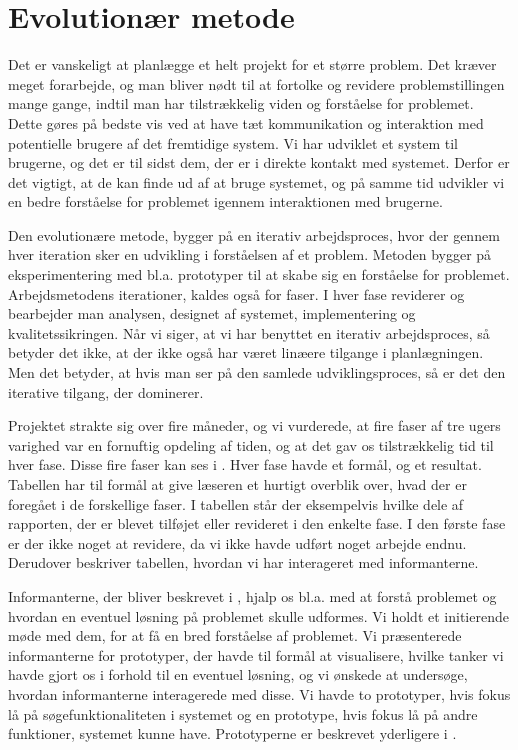 \section{Evolutionær metode}
\label{sec:evolution}

Det er vanskeligt at planlægge et helt projekt for et større problem. Det kræver meget forarbejde, og man bliver nødt til at fortolke og revidere problemstillingen mange gange, indtil man har tilstrækkelig viden og forståelse for problemet. Dette gøres på bedste vis ved at have tæt kommunikation og interaktion med potentielle brugere af det fremtidige system. Vi har udviklet et system til brugerne, og det er til sidst dem, der er i direkte kontakt med systemet. Derfor er det vigtigt, at de kan finde ud af at bruge systemet, og på samme tid udvikler vi en bedre forståelse for problemet igennem interaktionen med brugerne. 

Den evolutionære metode, bygger på en iterativ arbejdsproces, hvor der gennem hver iteration sker en udvikling i forståelsen af et problem. Metoden bygger på eksperimentering med bl.a. prototyper til at skabe sig en forståelse for problemet. Arbejdsmetodens iterationer, kaldes også for faser. I hver fase reviderer og bearbejder man analysen, designet af systemet, implementering og kvalitetssikringen. \cite{cic} Når vi siger, at vi har benyttet en iterativ arbejdsproces, så betyder det ikke, at der ikke også har været linæere tilgange i planlægningen. Men det betyder, at hvis man ser på den samlede udviklingsproces, så er det den iterative tilgang, der dominerer.

Projektet strakte sig over fire måneder, og vi vurderede, at fire faser af tre ugers varighed var en fornuftig opdeling af tiden, og at det gav os tilstrækkelig tid til hver fase. Disse fire faser kan ses i . Hver fase havde et formål, og et resultat. Tabellen har til formål at give læseren et hurtigt overblik over, hvad der er foregået i de forskellige faser. I tabellen står der eksempelvis hvilke dele af rapporten, der er blevet tilføjet eller revideret i den enkelte fase. I den første fase er der ikke noget at revidere, da vi ikke havde udført noget arbejde endnu. Derudover beskriver tabellen, hvordan vi har interageret med informanterne.

Informanterne, der bliver beskrevet i , hjalp os bl.a. med at forstå problemet og hvordan en eventuel løsning på problemet skulle udformes. Vi holdt et initierende møde med dem, for at få en bred forståelse af problemet. Vi præsenterede informanterne for prototyper, der havde til formål at visualisere, hvilke tanker vi havde gjort os i forhold til en eventuel løsning, og vi ønskede at undersøge, hvordan informanterne interagerede med disse. Vi havde to prototyper, hvis fokus lå på søgefunktionaliteten i systemet og en prototype, hvis fokus lå på andre funktioner, systemet kunne have. Prototyperne er beskrevet yderligere i . 



